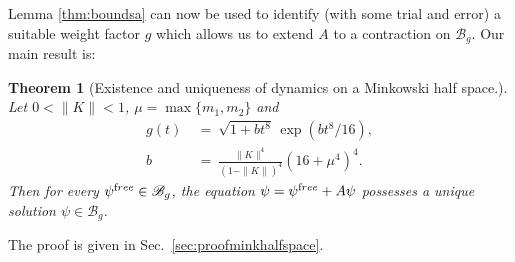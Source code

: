 \documentclass[b5paper,draft,openbib,12pt]{memoir}
\newtheorem{Thm}[Def]{Theorem}
\newcommand{\free}{{\textup free}}
\newcommand{\Banach}{\mathscr{B}}
\begin{document}
Lemma \ref{thm:boundsa} can now be used to identify (with some trial and error) a suitable weight factor $g$ which allows us to extend $A$ to a contraction on $\Banach_g$. Our main result is:

\begin{Thm}[Existence and uniqueness of dynamics on a Minkowski half space.] \label{thm:minkhalfspace}
	Let $0 < \| K \| < 1$, $\mu = \max \{ m_1,m_2\}$ and
	\begin{align} 
		g(t)& ~=~ \sqrt{1+b t^8}\, \exp(b t^8/16),	\label{eq:defg}\\
    		b& ~=~ \frac{\|K\|^4}{(1-\|K\|)^4} \left(16+\mu^4\right)^4. \label{eq:defb}
\end{align}
	Then for every $\psi^\free \in \Banach_g$, the equation $\psi = \psi^\free + A \psi$ possesses a unique solution $\psi \in \Banach_g$.
\end{Thm}

The proof is given in Sec.\ \ref{sec:proofminkhalfspace}.
\end{document}
